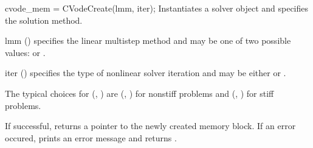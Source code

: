 {
cvode\_mem = CVodeCreate(lmm, iter);
}
{
  Instantiates a {\cvodes} solver object and specifies the solution method.
}
{
  \begin{args}[iter]
  \item[lmm] ()
    specifies the linear multistep method and may be one of two
    possible values:  or .     
  \item[iter] ()
    specifies the type of nonlinear solver iteration and may be
    either  or . 
  \end{args}
  The typical choices for (, ) are
  (, ) for nonstiff problems and
  (, ) for stiff problems.
}
{
  If successful,  returns a pointer to the newly created 
  {\cvodes} memory block.
  If an error occured,  prints an error message 
  and returns .
}
{}


